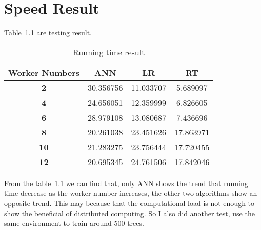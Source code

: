 \chapter{Speed Result}
\label{ch:speedResult}

Table~\ref{tb:runningTime} are testing result.\\

\begin{table}[h]
	\centering
	\begin{tabular}{|c|c|c|c|}
		\hline
		\textbf{Worker Numbers} & \textbf{ANN} & \textbf{LR} & \textbf{RT} \\ \hline
		\textbf{2}              & 30.356756    & 11.033707   & 5.689097    \\ \hline
		\textbf{4}              & 24.656051    & 12.359999   & 6.826605    \\ \hline
		\textbf{6}              & 28.979108    & 13.080687   & 7.436696    \\ \hline
		\textbf{8}              & 20.261038    & 23.451626   & 17.863971   \\ \hline
		\textbf{10}             & 21.283275    & 23.756444   & 17.720455   \\ \hline
		\textbf{12}             & 20.695345    & 24.761506   & 17.842046   \\ \hline
	\end{tabular}
	\caption{Running time result}
	\label{tb:runningTime}
\end{table}

From the table~\ref{tb:runningTime} we can find that, only ANN shows the trend that running time decrease as the worker number increases, the other two algorithms show an opposite trend. This may because that the computational load is not enough to show the beneficial of distributed computing. So I also did another test, use the same environment to train around 500 trees.